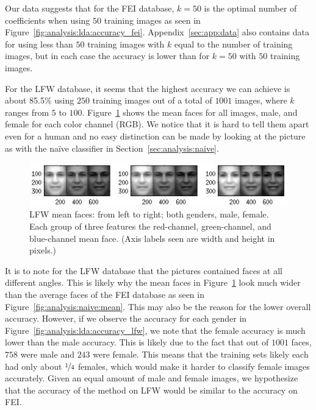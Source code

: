 \documentclass[hidelinks,11pt]{article}
\begin{document}
Our data suggests that for the FEI database, $k = 50$ is the optimal number of
coefficients when using $50$ training images as seen in
Figure~\ref{fig:analysis:lda:accuracy_fei}. Appendix~\ref{sec:app:data} also
contains data for using less than $50$ training images with $k$ equal to the
number of training images, but in each case the accuracy is lower than for $k =
50$ with $50$ training images.

For the LFW database, it seems that the highest accuracy we can achieve is about
85.5\% using $250$ training images out of a total of $1001$ images, where $k$
ranges from $5$ to $100$. Figure~\ref{fig:analysis:lda:mean} shows the mean
faces for all images, male, and female for each color channel (RGB). We notice
that it is hard to tell them apart even for a human and no easy distinction can
be made by looking at the picture as with the na\"ive classifier in
Section~\ref{sec:analysis:naive}. 

\begin{figure}[!ht]
  \centering
  \includegraphics{avg.jpg}
  \caption{LFW mean faces: from left to right; both genders, male, female. Each
  group of three features the red-channel, green-channel, and blue-channel mean
  face. (Axis labels seen are width and height in pixels.)}
  \label{fig:analysis:lda:mean}
\end{figure}

It is to note for the LFW database that the
pictures contained faces at all different angles. This is likely why the mean
faces in Figure~\ref{fig:analysis:lda:mean} look much wider than the average
faces of the FEI database as seen in Figure~\ref{fig:analysis:naive:mean}. This
may also be the reason for the lower overall accuracy. However, if we observe
the accuracy for each gender in Figure~\ref{fig:analysis:lda:accuracy_lfw}, we
note that the female accuracy is much lower than the male accuracy. This is
likely due to the fact that out of $1001$ faces, $758$ were male and $243$ were
female. This means that the training sets likely each had only about
$\nicefrac{1}{4}$ females, which would make it harder to classify female images
accurately. Given an equal amount of male and female images, we hypothesize that
the accuracy of the method on LFW would be similar to the accuracy on FEI.
\end{document}
